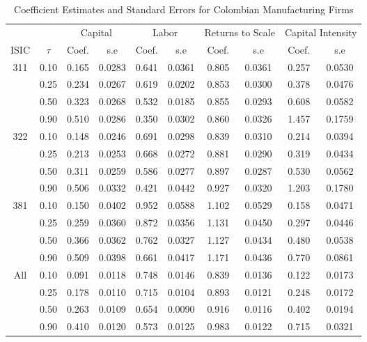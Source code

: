 \begin{table}[ht]
\centering
\caption{Coefficient Estimates and Standard Errors for Colombian Manufacturing Firms} 
\begin{tabular}{cccccccccc}
  \hline\hline & & \multicolumn{2}{c}{Capital}  & \multicolumn{2}{c}{Labor} & \multicolumn{2}{c}{Returns to Scale} & \multicolumn{2}{c}{Capital Intensity}\\ \cmidrule(lr){3-4} \cmidrule(lr){5-6} \cmidrule(lr){7-8} \cmidrule(lr){9-10}ISIC & $\tau$ & Coef. & s.e & Coef. & s.e & Coef. & s.e & Coef. & s.e \\ 
  \hline
311 & 0.10 & 0.165 & 0.0283 & 0.641 & 0.0361 & 0.805 & 0.0361 & 0.257 & 0.0530 \\ 
   & 0.25 & 0.234 & 0.0267 & 0.619 & 0.0202 & 0.853 & 0.0300 & 0.378 & 0.0476 \\ 
   & 0.50 & 0.323 & 0.0268 & 0.532 & 0.0185 & 0.855 & 0.0293 & 0.608 & 0.0582 \\ 
   & 0.90 & 0.510 & 0.0286 & 0.350 & 0.0302 & 0.860 & 0.0326 & 1.457 & 0.1759 \\ 
  322 & 0.10 & 0.148 & 0.0246 & 0.691 & 0.0298 & 0.839 & 0.0310 & 0.214 & 0.0394 \\ 
   & 0.25 & 0.213 & 0.0253 & 0.668 & 0.0272 & 0.881 & 0.0290 & 0.319 & 0.0434 \\ 
   & 0.50 & 0.311 & 0.0259 & 0.586 & 0.0277 & 0.897 & 0.0287 & 0.530 & 0.0562 \\ 
   & 0.90 & 0.506 & 0.0332 & 0.421 & 0.0442 & 0.927 & 0.0320 & 1.203 & 0.1780 \\ 
  381 & 0.10 & 0.150 & 0.0402 & 0.952 & 0.0588 & 1.102 & 0.0529 & 0.158 & 0.0471 \\ 
   & 0.25 & 0.259 & 0.0360 & 0.872 & 0.0356 & 1.131 & 0.0450 & 0.297 & 0.0446 \\ 
   & 0.50 & 0.366 & 0.0362 & 0.762 & 0.0327 & 1.127 & 0.0434 & 0.480 & 0.0538 \\ 
   & 0.90 & 0.509 & 0.0398 & 0.661 & 0.0417 & 1.171 & 0.0436 & 0.770 & 0.0861 \\ 
  All & 0.10 & 0.091 & 0.0118 & 0.748 & 0.0146 & 0.839 & 0.0136 & 0.122 & 0.0173 \\ 
   & 0.25 & 0.178 & 0.0110 & 0.715 & 0.0104 & 0.893 & 0.0121 & 0.248 & 0.0172 \\ 
   & 0.50 & 0.263 & 0.0109 & 0.654 & 0.0090 & 0.916 & 0.0116 & 0.402 & 0.0194 \\ 
   & 0.90 & 0.410 & 0.0120 & 0.573 & 0.0125 & 0.983 & 0.0122 & 0.715 & 0.0321 \\ 
   \hline
\end{tabular}
\end{table}
